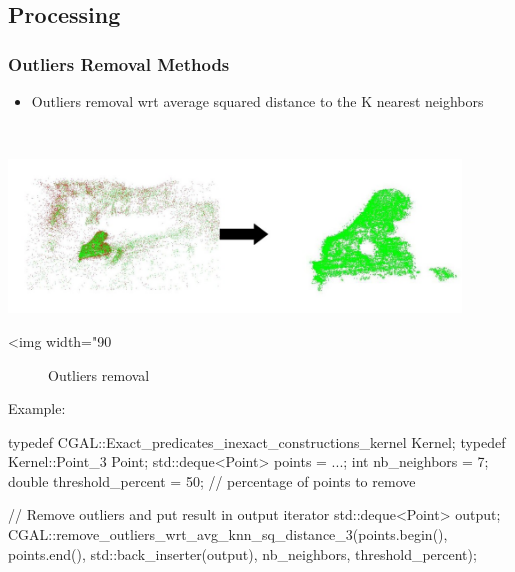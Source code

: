\subsection{Processing}

\subsubsection{Outliers Removal Methods}

\begin{itemize}
\item Outliers removal wrt average squared distance to the K nearest neighbors
\end{itemize}

  \\

\begin{center}
    \label{Surface_reconstruction_3-fig-outliers_removal}
    \begin{ccTexOnly}
        \includegraphics[width=0.9\textwidth]{Surface_reconstruction_3/outliers_removal} %
    \end{ccTexOnly}
    \begin{ccHtmlOnly}
        <img width="90%
    \end{ccHtmlOnly}
    \begin{figure}[h]
        \caption{Outliers removal}
    \end{figure}
\end{center}

Example:

\begin{ccExampleCode}
typedef CGAL::Exact_predicates_inexact_constructions_kernel Kernel;
typedef Kernel::Point_3 Point;
std::deque<Point> points = ...;
int nb_neighbors = 7;
double threshold_percent = 50; // percentage of points to remove

// Remove outliers and put result in output iterator
std::deque<Point> output;
CGAL::remove_outliers_wrt_avg_knn_sq_distance_3(points.begin(), points.end(),
                                                std::back_inserter(output),
                                                nb_neighbors,
                                                threshold_percent);
\end{ccExampleCode}


